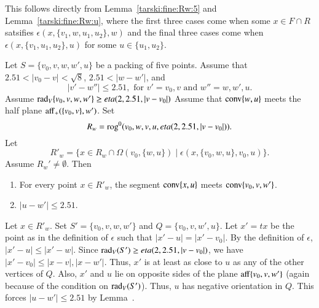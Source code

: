 \begin{tarskidata}
\begin{tarski}
\begin{proved}  This follows directly from Lemma~\ref{tarski:fine:Rw:5}
and Lemma~\ref{tarski:fine:Rw:u}, where the first three cases
come when some $x\in F\cap R$ satsifies
  $\epsilon(x,\{v_1,w,u_1,u_2\},w)$ and the final three cases
come when $\epsilon(x,\{v_1,u_1,u_2\},u)$ for some $u\in \{u_1,u_2\}$.
\swallowed\end{proved}
\end{tarski}






\begin{tarski}

\begin{lemma}
Let $S=\{v_0,v,w,w',u\}$ be a packing of five points.
Assume that $2.51<|v_0-v|<\sqrt8$, $2.51<|w-w'|$, and
  $$
  |v'-w''| \le 2.51, \text{ for } v'=v_0,v \text{ and } w''=w,w',u.
  $$
Assume $\operatorname{rad}_V\{v_0,v,w,w'\}\ge eta(2,2.51,|v-v_0|)$
Assume that ${\operatorname{conv}}\{w,u\}$ meets the
half plane ${\operatorname{aff}}_+(\{v_0,v\},w')$.
Set
  $$R_w={\operatorname{rog}}^0(v_0,w,v,u,eta(2,2.51,|v-v_0|)).$$
Let 
   $$R'_w = \{x\in R_w \cap\Omega(v_0,\{w,u\}) \mid
     \epsilon(x,\{v_0,w,u\},v_0,u)\}.$$
Assume $R_w'\ne \emptyset$.
Then
\begin{enumerate}
 \item  For every point $x\in R'_w$, the segment ${\operatorname{conv}}\{x,u\}$ meets
  ${\operatorname{conv}}\{v_0,v,w'\}$.
\item $|u-w'|\le 2.51$.
\end{enumerate}
\end{lemma}

\begin{proved} 
Let $x\in R'_w$. Set $S'=\{v_0,v,w,w'\}$ and $Q=\{v_0,v,w',u\}$.
Let $x' = t x$ be the point as in the definition of $\epsilon$ such
that $|x'-u|=|x'-v_0|$.  By the definition of $\epsilon$,
$|x'-u| \le |x'-w|$.  Since $\operatorname{rad}_V(S')\ge eta(2,2.51,|v-v_0|)$, we have
$|x'-v_0| \le |x-v|,|x-w'|$.  Thus, $x'$ is at least as close to $u$
as any of the other vertices of $Q$.  Also, $x'$
and $u$ lie on opposite sides of the plane ${\operatorname{aff}}\{v_0,v,w'\}$
(again because of the condition on $\operatorname{rad}_V(S')$).  Thus, $u$ has
negative orientation in $Q$.  This forces 
$|u-w'|\le 2.51$ by Lemma~.


\end{proved}
\end{tarski}
\end{tarskidata}
